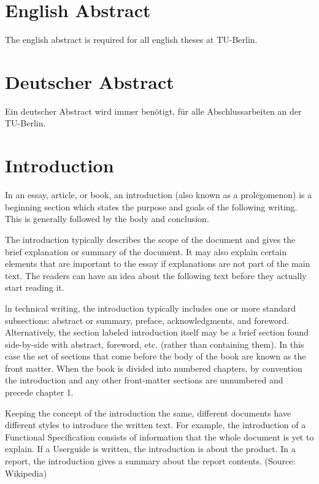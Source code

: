 
\section{English Abstract}
\begin{onehalfspace}
	
	The english abstract is required for all english theses at TU-Berlin.
\end{onehalfspace}
\clearpage

\section{Deutscher Abstract}
\begin{onehalfspace}
	
	Ein deutscher Abstract wird immer benötigt, für alle Abschlussarbeiten an der TU-Berlin. 
\end{onehalfspace}
\clearpage

\section{Introduction}
\label{sec:Introduction}

In an essay, article, or book, an introduction (also known as a prolegomenon) is a beginning section which states the purpose and goals of the following writing. This is generally followed by the body and conclusion.

The introduction typically describes the scope of the document and gives the brief explanation or summary of the document. It may also explain certain elements that are important to the essay if explanations are not part of the main text. The readers can have an idea about the following text before they actually start reading it.

ln technical writing, the introduction typically includes one or more standard subsections: abstract or summary, preface, acknowledgments, and foreword. Alternatively, the section labeled introduction itself may be a brief section found side-by-side with abstract, foreword, etc. (rather than containing them). In this case the set of sections that come before the body of the book are known as the front matter. When the book is divided into numbered chapters, by convention the introduction and any other front-matter sections are unnumbered and precede chapter 1.

Keeping the concept of the introduction the same, different documents have different styles to introduce the written text. For example, the introduction of a Functional Specification consists of information that the whole document is yet to explain. If a Userguide is written, the introduction is about the product. In a report, the introduction gives a summary about the report contents. (Source: Wikipedia)


